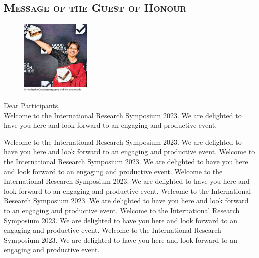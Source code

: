 \thispagestyle{fancy}
	
	\vspace{-2em} %
	\begin{center}



\subsection*{\textsc{Message of the Guest of Honour}}
	\end{center}

   
    
    \begin{figure}
		\includegraphics[width=0.3\textwidth]{Images/Guest.jpeg}
	\end{figure}
	\vspace{2em} %




	
	\noindent	Dear Participants,\\
	
	\noindent
	Welcome to the International Research Symposium 2023. We are delighted to have you here and look forward to an engaging and productive event. 
	
	Welcome to the International Research Symposium 2023. We are delighted to have you here and look forward to an engaging and productive event. Welcome to the International Research Symposium 2023. We are delighted to have you here and look forward to an engaging and productive event. Welcome to the International Research Symposium 2023. We are delighted to have you here and look forward to an engaging and productive event. Welcome to the International Research Symposium 2023. We are delighted to have you here and look forward to an engaging and productive event. Welcome to the International Research Symposium 2023. We are delighted to have you here and look forward to an engaging and productive event. Welcome to the International Research Symposium 2023. We are delighted to have you here and look forward to an engaging and productive event. 
	
